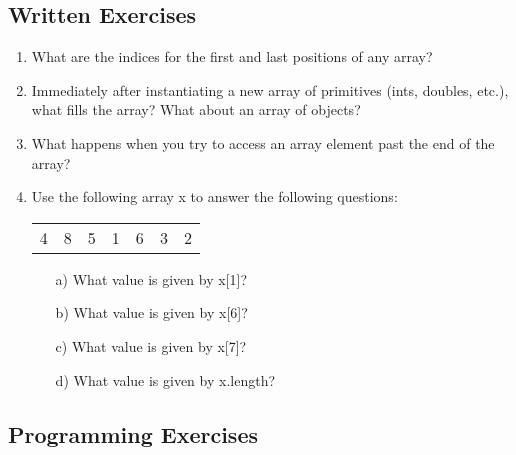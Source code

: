 
\subsection{Written Exercises}

\setcounter{counter}{1}
\begin{enumerate}[label={\arabic{counter}\addtocounter{counter}{1}}.]

\item What are the indices for the first and last positions of any array?

\item Immediately after instantiating a new array of primitives (ints, doubles, etc.), what fills the array? What about an array of objects?

\item What happens when you try to access an array element past the end of the array?

\item Use the following array x to answer the following questions:
\begin{table}[h]
\begin{tabular}{lllllll}
4 & 8 & 5 & 1 & 6 & 3 & 2
\end{tabular}
\end{table}
\begin{enumerate}
\item[a)]What value is given by x[1]?
\item[b)]What value is given by x[6]?
\item[c)]What value is given by x[7]?
\item[d)]What value is given by x.length?
\end{enumerate}

\end{enumerate}

\subsection{Programming Exercises}


